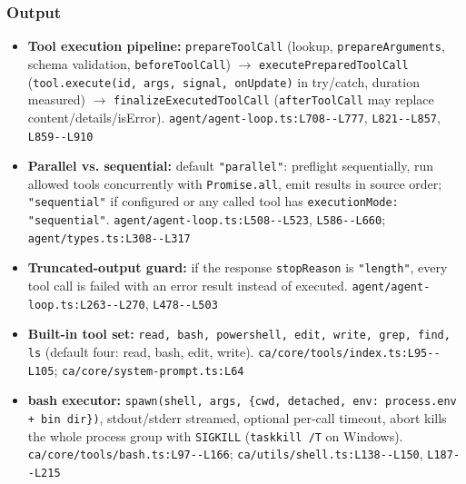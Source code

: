 \subsubsection*{Output}
\begin{itemize}
\item \textbf{Tool execution pipeline:} \texttt{prepareToolCall} (lookup, \texttt{prepareArguments}, schema validation, \texttt{beforeToolCall}) $\rightarrow$ \texttt{executePreparedToolCall} (\texttt{tool.\allowbreak{}execute(\allowbreak{}id, args, signal, onUpdate)} in try/catch, duration measured) $\rightarrow$ \texttt{finalizeExecutedToolCall} (\texttt{afterToolCall} may replace content/details/isError). \texttt{agent/\allowbreak{}agent-\allowbreak{}loop.\allowbreak{}ts:\allowbreak{}L708-\allowbreak{}-\allowbreak{}L777}, \texttt{L821-\allowbreak{}-\allowbreak{}L857}, \texttt{L859-\allowbreak{}-\allowbreak{}L910}
\item \textbf{Parallel vs. sequential:} default \texttt{"parallel"}: preflight sequentially, run allowed tools concurrently with \texttt{Promise.\allowbreak{}all}, emit results in source order; \texttt{"sequential"} if configured or any called tool has \texttt{executionMode:\allowbreak{} "sequential"}. \texttt{agent/\allowbreak{}agent-\allowbreak{}loop.\allowbreak{}ts:\allowbreak{}L508-\allowbreak{}-\allowbreak{}L523}, \texttt{L586-\allowbreak{}-\allowbreak{}L660}; \texttt{agent/\allowbreak{}types.\allowbreak{}ts:\allowbreak{}L308-\allowbreak{}-\allowbreak{}L317}
\item \textbf{Truncated-output guard:} if the response \texttt{stopReason} is \texttt{"length"}, every tool call is failed with an error result instead of executed. \texttt{agent/\allowbreak{}agent-\allowbreak{}loop.\allowbreak{}ts:\allowbreak{}L263-\allowbreak{}-\allowbreak{}L270}, \texttt{L478-\allowbreak{}-\allowbreak{}L503}
\item \textbf{Built-in tool set:} \texttt{read, bash, powershell, edit, write, grep, find, ls} (default four: read, bash, edit, write). \texttt{ca/\allowbreak{}core/\allowbreak{}tools/\allowbreak{}index.\allowbreak{}ts:\allowbreak{}L95-\allowbreak{}-\allowbreak{}L105}; \texttt{ca/\allowbreak{}core/\allowbreak{}system-\allowbreak{}prompt.\allowbreak{}ts:\allowbreak{}L64}
\item \textbf{bash executor:} \texttt{spawn(\allowbreak{}shell, args, \{cwd, detached, env:\allowbreak{} process.\allowbreak{}env + bin dir\})}, stdout/stderr streamed, optional per-call timeout, abort kills the whole process group with \texttt{SIGKILL} (\texttt{taskkill /\allowbreak{}T} on Windows). \texttt{ca/\allowbreak{}core/\allowbreak{}tools/\allowbreak{}bash.\allowbreak{}ts:\allowbreak{}L97-\allowbreak{}-\allowbreak{}L166}; \texttt{ca/\allowbreak{}utils/\allowbreak{}shell.\allowbreak{}ts:\allowbreak{}L138-\allowbreak{}-\allowbreak{}L150}, \texttt{L187-\allowbreak{}-\allowbreak{}L215}

\end{itemize}
